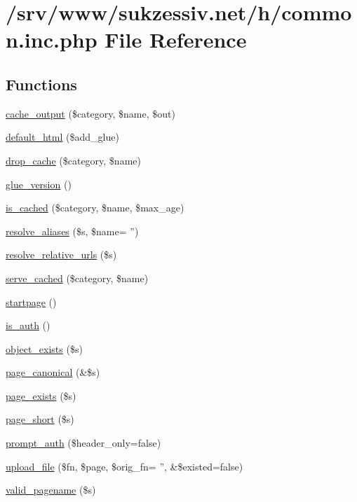 \hypertarget{common_8inc_8php}{
\section{/srv/www/sukzessiv.net/h/common.inc.php File Reference}
\label{common_8inc_8php}
}
\subsection*{Functions}
\begin{CompactItemize}
\item 
\hyperlink{common_8inc_8php_6cceb5c6a3c421c18e925515c78f6dfd}{cache\_\-output} (\$category, \$name, \$out)
\item 
\hyperlink{common_8inc_8php_8916cb6ec34ceeb3f48c86655c305974}{default\_\-html} (\$add\_\-glue)
\item 
\hyperlink{common_8inc_8php_7ca47f8aab349971cde2d4b02441cf41}{drop\_\-cache} (\$category, \$name)
\item 
\hyperlink{common_8inc_8php_0d6d0da45f4adf6283bcccec9fd107e3}{glue\_\-version} ()
\item 
\hyperlink{common_8inc_8php_6fb34b9210b43349ca3eb16b2738a28b}{is\_\-cached} (\$category, \$name, \$max\_\-age)
\item 
\hyperlink{common_8inc_8php_78992fdfae6cd9d7d4e8053d004d1709}{resolve\_\-aliases} (\$s, \$name= '')
\item 
\hyperlink{common_8inc_8php_81eb70073067db81ab43829870f15e6d}{resolve\_\-relative\_\-urls} (\$s)
\item 
\hyperlink{common_8inc_8php_ac90387dcab722e243df2d083f8d6a00}{serve\_\-cached} (\$category, \$name)
\item 
\hyperlink{common_8inc_8php_0a3ee1e9beca572266648f17b9c4c75f}{startpage} ()
\item 
\hyperlink{common_8inc_8php_b3abbb2cd13e01231533e7cdc93da6db}{is\_\-auth} ()
\item 
\hyperlink{common_8inc_8php_3d71a269e01b98748fb57719feef27be}{object\_\-exists} (\$s)
\item 
\hyperlink{common_8inc_8php_31ed04b0c90ac3077e71743c307d45f8}{page\_\-canonical} (\&\$s)
\item 
\hyperlink{common_8inc_8php_a71868111dd5b8af98df9cc9c968e523}{page\_\-exists} (\$s)
\item 
\hyperlink{common_8inc_8php_da968adfb989aa09adaf29867208f1ab}{page\_\-short} (\$s)
\item 
\hyperlink{common_8inc_8php_80c23c9d8ac02159151d6368506b1b54}{prompt\_\-auth} (\$header\_\-only=false)
\item 
\hyperlink{common_8inc_8php_4659077c34b709eec75f9897ea07e55a}{upload\_\-file} (\$fn, \$page, \$orig\_\-fn= '', \&\$existed=false)
\item 
\hyperlink{common_8inc_8php_0ef613d233a6e62f7e631b8dfcd710bf}{valid\_\-pagename} (\$s)
\end{CompactItemize}


